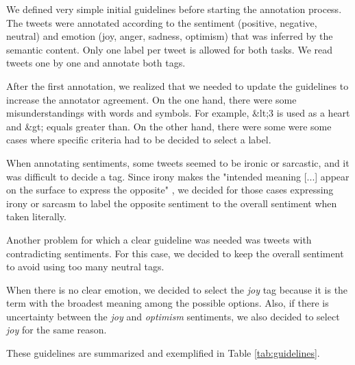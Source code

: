 \documentclass[11pt,a4paper]{article}
\begin{document}
We defined very simple initial guidelines before starting the annotation process. The tweets were annotated according to the sentiment (positive, negative, neutral) and emotion (joy, anger, sadness, optimism) that was inferred by the semantic content. Only one label per tweet is allowed for both tasks. We read tweets one by one and annotate both tags.

After the first annotation, we realized that we needed to update the guidelines to increase the annotator agreement. On the one hand, there were some misunderstandings with words and symbols. For example, \&lt;3 is used as a heart and \&gt; equals greater than. On the other hand, there were some were some cases where specific criteria had to be decided to select a label.

When annotating sentiments, some tweets seemed to be ironic or sarcastic, and it was difficult to decide a tag. Since irony makes the "intended meaning [...] appear on the surface to express the opposite" \cite{OUP2022}, we decided for those cases expressing irony or sarcasm to label the opposite sentiment to the overall sentiment when taken literally. 

Another problem for which a clear guideline was needed was tweets with contradicting sentiments. For this case, we decided to keep the overall sentiment to avoid using too many neutral tags.

When there is no clear emotion, we decided to select the \textit{joy} tag because it is the term with the broadest meaning among the possible options. Also, if there is uncertainty between the \textit{joy} and \textit{optimism} sentiments, we also decided to select \textit{joy} for the same reason.

These guidelines are summarized and exemplified in Table \ref{tab:guidelines}.
\end{document}

